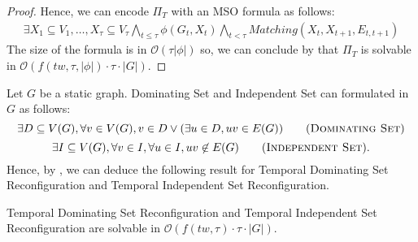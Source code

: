 \begin{proof}
Hence, we can encode $\Pi_T$ with an MSO formula as follows:
\begin{eqnarray}
\exists X_1 \subseteq V_1,\dots, X_\tau \subseteq V_\tau \bigwedge\limits_{t\leq\tau} \phi(G_t,X_t) \bigwedge\limits_{t<\tau} Matching(X_t,X_{t+1},E_{t,t+1})  
\end{eqnarray}
The size of the formula is in $\mathcal{O}(\tau |\phi|)$ so, we can conclude by  that $\Pi_T$ is solvable in $\mathcal{O}(f(tw,\tau,|\phi|) \cdot \tau\cdot|G|)$.
\end{proof}

\noindent Let $G$ be a static graph. {\sc Dominating Set} and {\sc Independent Set} can formulated in $G$ as follows:
  \[
    \exists D \subseteq V(G), \forall v \in V(G), v \in D \vee (\exists u\in D, uv\in E(G)) \tag{{\sc Dominating Set}}
  \]
  \[
    \exists I \subseteq V(G), \forall v \in I, \forall u \in I, uv \not\in E(G) \tag{{\sc Independent Set}}. 
  \]
  Hence, by , we can deduce the following result for {\sc Temporal Dominating Set Reconfiguration} and {\sc Temporal Independent Set Reconfiguration}.

\begin{corollary}
{\sc Temporal Dominating Set Reconfiguration} and {\sc Temporal Independent Set Reconfiguration} are solvable in $\mathcal{O}(f(tw,\tau) \cdot \tau\cdot|G|)$.
\end{corollary}




